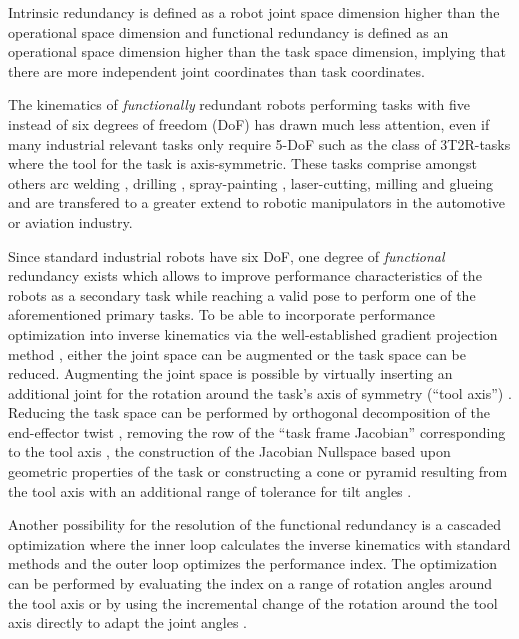 \documentclass{svproc}
\begin{document}
Intrinsic redundancy is defined as a robot joint space dimension higher than the operational space dimension and functional redundancy is defined as an operational space dimension higher than the task space dimension, implying that there are more independent joint coordinates than task coordinates.

The kinematics of \emph{functionally} redundant robots performing tasks with five instead of six degrees of freedom (DoF) has drawn much less attention, even if many industrial relevant tasks only require 5-DoF such as the class of 3T2R-tasks where the tool for the task is axis-symmetric.
These tasks comprise amongst others arc welding \cite{HuoBar2005}, drilling \cite{ZhuQuCaoYan2013,GuoDonKe2015}, spray-painting \cite{FromGra2010}, laser-cutting, milling and glueing and are transfered to a greater extend to robotic manipulators in the automotive or aviation industry.

Since standard industrial robots have six DoF, one degree of \emph{functional} redundancy exists which allows to improve performance characteristics of the robots as a secondary task while reaching a valid pose to perform one of the aforementioned primary tasks.
To be able to incorporate performance optimization into inverse kinematics via the well-established gradient projection method \cite{Yoshikawa1984}, either the joint space can be augmented or the task space can be reduced. %
Augmenting the joint space is possible by virtually inserting an additional joint for the rotation around the task's axis of symmetry (``tool axis'') \cite{Baron2000}.
Reducing the task space can be performed by orthogonal decomposition of the end-effector twist \cite{HuoBar2005}, removing the row of the ``task frame Jacobian'' corresponding to the tool axis \cite{Zlajpah2017}, the construction of the Jacobian Nullspace based upon geometric properties of the task \cite{LegerAng2016} or constructing a cone or pyramid resulting from the tool axis with an additional range of tolerance for tilt angles \cite{FromGra2010}.

Another possibility for the resolution of the functional redundancy is a cascaded optimization where the inner loop calculates the inverse kinematics with standard methods and the outer loop optimizes the performance index.
The optimization can be performed by evaluating the index on a range of rotation angles around the tool axis \cite{ZhuQuCaoYan2013} or by using the incremental change of the rotation around the tool axis directly to adapt the joint angles  \cite{GuoDonKe2015}.
\end{document}
